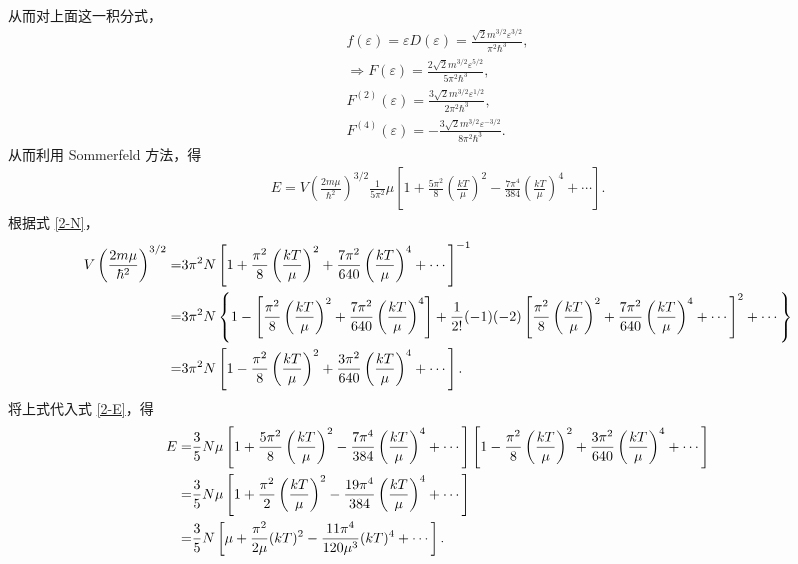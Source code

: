 \documentclass{assignment}
\begin{document}
\begin{pf}
\begin{align}
    \end{align}
    从而对上面这一积分式，
    \begin{gather}
        f(\varepsilon)=\varepsilon D(\varepsilon)=\frac{\sqrt{2}m^{3/2}\varepsilon^{3/2}}{\pi^2\hbar^3},\\
        \Longrightarrow F(\varepsilon)=\frac{2\sqrt{2}m^{3/2}\varepsilon^{5/2}}{5\pi^2\hbar^3},\\
        F^{(2)}(\varepsilon)=\frac{3\sqrt{2}m^{3/2}\varepsilon^{1/2}}{2\pi^2\hbar^3},\\
        F^{(4)}(\varepsilon)=-\frac{3\sqrt{2}m^{3/2}\varepsilon^{-3/2}}{8\pi^2\hbar^3}.
    \end{gather}
    从而利用 Sommerfeld 方法，得
    \begin{align}
        \label{2-E}
        E=V\left(\frac{2m\mu}{\hbar^2}\right)^{3/2}\frac{1}{5\pi^2}\mu\left[1+\frac{5\pi^2}{8}\left(\frac{kT}{\mu}\right)^2-\frac{7\pi^4}{384}\left(\frac{kT}{\mu}\right)^4+\cdots\right].
    \end{align}
    根据式 \eqref{2-N}，
    \begin{align}
        \notag V\left(\frac{2m\mu}{\hbar^2}\right)^{3/2}=&3\pi^2N\left[1+\frac{\pi^2}{8}\left(\frac{kT}{\mu}\right)^2+\frac{7\pi^2}{640}\left(\frac{kT}{\mu}\right)^4+\cdots\right]^{-1}\\
        \notag=&3\pi^2N\left\{1-\left[\frac{\pi^2}{8}\left(\frac{kT}{\mu}\right)^2+\frac{7\pi^2}{640}\left(\frac{kT}{\mu}\right)^4\right]+\frac{1}{2!}(-1)(-2)\left[\frac{\pi^2}{8}\left(\frac{kT}{\mu}\right)^2+\frac{7\pi^2}{640}\left(\frac{kT}{\mu}\right)^4+\cdots\right]^2+\cdots\right\}\\
        =&3\pi^2N\left[1-\frac{\pi^2}{8}\left(\frac{kT}{\mu}\right)^2+\frac{3\pi^2}{640}\left(\frac{kT}{\mu}\right)^4+\cdots\right].
    \end{align}
    将上式代入式 \eqref{2-E}，得
    \begin{align}
        \notag E=&\frac{3}{5}N\mu\left[1+\frac{5\pi^2}{8}\left(\frac{kT}{\mu}\right)^2-\frac{7\pi^4}{384}\left(\frac{kT}{\mu}\right)^4+\cdots\right]\left[1-\frac{\pi^2}{8}\left(\frac{kT}{\mu}\right)^2+\frac{3\pi^2}{640}\left(\frac{kT}{\mu}\right)^4+\cdots\right]\\
        \notag=&\frac{3}{5}N\mu\left[1+\frac{\pi^2}{2}\left(\frac{kT}{\mu}\right)^2-\frac{19\pi^4}{384}\left(\frac{kT}{\mu}\right)^4+\cdots\right]\\
        =&\frac{3}{5}N\left[\mu+\frac{\pi^2}{2\mu}(kT)^2-\frac{11\pi^4}{120\mu^3}(kT)^4+\cdots\right].
    \end{align}

\end{pf}
\end{document}
